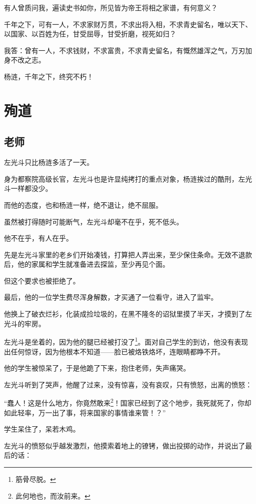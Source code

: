 \begin{multicols}{\theparacolNo}
有人曾质问我，遍读史书如你，所见皆为帝王将相之家谱，有何意义？

千年之下，可有一人，不求家财万贯，不求出将入相，不求青史留名，唯以天下、以国家、以百姓为任，甘受屈辱，甘受折磨，视死如归？

我答：曾有一人，不求钱财，不求富贵，不求青史留名，有慨然雄浑之气，万刃加身不改之志。

杨涟，千年之下，终究不朽！

\ifnum{}
	\end{multicols}
\fi
\newpage
\section{殉道}
\ifnum{}
	\begin{multicols}{\theparacolNo}
\fi
\subsection{老师}
左光斗只比杨涟多活了一天。

身为都察院高级长官，左光斗也是许显纯拷打的重点对象，杨涟挨过的酷刑，左光斗一样都没少。

而他的态度，也和杨涟一样，绝不退让，绝不屈服。

虽然被打得随时可能断气，左光斗却毫不在乎，死不低头。

他不在乎，有人在乎。

先是左光斗家里的老乡们开始凑钱，打算把人弄出来，至少保住条命。无效不退款后，他的家属和学生就准备进去探监，至少再见个面。

但这个要求也被拒绝了。

最后，他的一位学生费尽浑身解数，才买通了一位看守，进入了监牢。

他换上了破衣烂衫，化装成捡垃圾的，在黑不隆冬的诏狱里摸了半天，才摸到了左光斗的牢房。

左光斗是坐着的，因为他的腿已经被打没了\footnote{筋骨尽脱。}。面对自己学生的到访，他没有表现出任何惊讶，因为他根本不知道——脸已被烙铁烙坏，连眼睛都睁不开。

他的学生被惊呆了，于是他跪了下来，抱住老师，失声痛哭。

左光斗听到了哭声，他醒了过来，没有惊喜，没有哀叹，只有愤怒，出离的愤怒：

“蠢人！这是什么地方，你竟然敢来\footnote{此何地也，而汝前来。}！国家已经到了这个地步，我死就死了，你却如此轻率，万一出了事，将来国家的事情谁来管！？”

学生呆住了，呆若木鸡。

左光斗的愤怒似乎越发激烈，他摸索着地上的镣铐，做出投掷的动作，并说出了最后的话：


\end{multicols}
